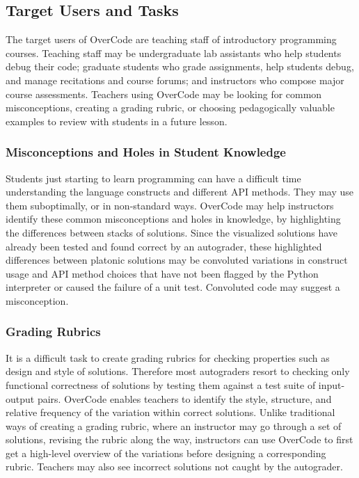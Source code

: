 \documentclass[12pt,twoside]{mitthesis}
\providecommand{\DIFdelbegin}{} %
\providecommand{\DIFdelend}{} %
\begin{document}
\subsection{Target Users and Tasks}
The target users of OverCode are teaching staff of introductory programming courses. Teaching staff may be undergraduate lab assistants who help students debug their code; graduate students who grade assignments, help students debug, and manage recitations and course forums; and instructors who compose major course assessments. Teachers using OverCode may be looking for common misconceptions, creating a grading rubric, or choosing pedagogically valuable examples to review with students in a future lesson.

\subsubsection{Misconceptions and Holes in Student Knowledge}
Students just starting to learn programming can have a difficult time understanding the language constructs and different API methods. They may use them suboptimally, or in non-standard ways. OverCode may help instructors identify these common misconceptions and holes in knowledge, by highlighting the differences between stacks of solutions. Since the visualized solutions have already been tested and found correct by an autograder, these highlighted differences between platonic solutions may be convoluted variations in construct usage and API method choices that have not been flagged by the Python interpreter or caused the failure of a unit test. Convoluted code may suggest a misconception.

\DIFdelbegin %
\DIFdelend %

\subsubsection{Grading Rubrics}
It is a difficult task to create grading rubrics for checking properties such as design and style of solutions. Therefore most autograders resort to checking only functional correctness of solutions by testing them against a test suite of input-output pairs. OverCode enables teachers to identify the style, structure, and relative frequency of the variation within correct solutions. Unlike traditional ways of creating a grading rubric, where an instructor may go through a set of solutions, revising the rubric along the way, instructors can use OverCode to first get a high-level overview of the variations before designing a corresponding rubric. Teachers may also see incorrect solutions not caught by the autograder.
\end{document}

